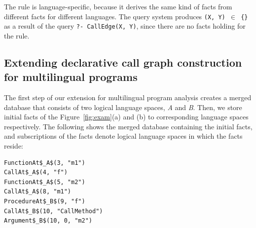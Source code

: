 \noindent
The rule is language-specific, because it derives the same kind of facts from
different facts for different languages.  The query system produces {\tt (X, Y)
$\in$ \{\}} as a result of the query {\tt ?- CallEdge(X, Y)}, since there are
no facts holding for the rule.

%


\subsection{Extending declarative call graph construction for multilingual programs}


The first step of our extension for multilingual program analysis creates a
merged database that consists of two logical language spaces, {\it A} and {\it
B}. Then, we store initial facts of the Figure~\ref{fig:exam}(a) and (b) to
corresponding language spaces respectively. The following shows the merged
database containing the initial facts, and subscriptions of the facts denote
logical language spaces in which the facts reside: 

\begin{lstlisting}
FunctionAt$_A$(3, "m1")
CallAt$_A$(4, "f")
FunctionAt$_A$(5, "m2")
CallAt$_A$(8, "m1")
ProcedureAt$_B$(9, "f")
CallAt$_B$(10, "CallMethod")
Argument$_B$(10, 0, "m2")
\end{lstlisting}


